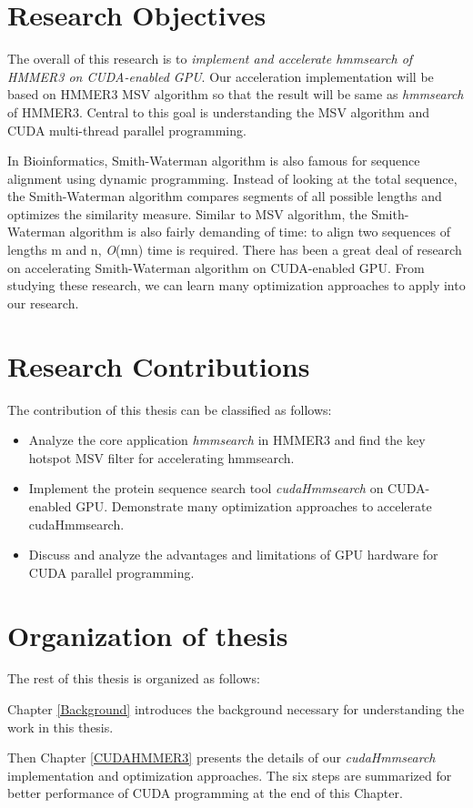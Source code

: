 \section{Research Objectives}
The overall of this research is to \emph{implement and accelerate hmmsearch of HMMER3 on CUDA-enabled GPU}. Our acceleration implementation will be based on HMMER3 MSV algorithm so that the result will be same as \emph{hmmsearch} of HMMER3. Central to this goal is understanding the MSV algorithm and CUDA multi-thread parallel programming. 

In Bioinformatics, Smith-Waterman algorithm is also famous for sequence alignment using dynamic programming. Instead of looking at the total sequence, the Smith-Waterman algorithm compares segments of all possible lengths and optimizes the similarity measure. Similar to MSV algorithm, the Smith-Waterman algorithm is also fairly demanding of time: to align two sequences of lengths m and n, \emph{O}(mn) time is required. There has been a great deal of research on accelerating Smith-Waterman algorithm on CUDA-enabled GPU. From studying these research, we can learn many optimization approaches to apply into our research.

\section{Research Contributions}
The contribution of this thesis can be classified as follows:
\begin{itemize}
 \item Analyze the core application \emph{hmmsearch} in HMMER3 and find the key hotspot MSV filter for accelerating hmmsearch.
 \item Implement the protein sequence search tool \emph{cudaHmmsearch} on CUDA-enabled GPU. Demonstrate many optimization approaches to accelerate cudaHmmsearch.
 \item Discuss and analyze the advantages and limitations of GPU hardware for CUDA parallel programming.
\end{itemize}

\section{Organization of thesis}
The rest of this thesis is organized as follows:

Chapter \ref{Background} introduces the background necessary for understanding the work in this thesis.

Then Chapter \ref{CUDAHMMER3} presents the details of our \emph{cudaHmmsearch} implementation and optimization approaches. The six steps are summarized for better performance of CUDA programming at the end of this Chapter.

